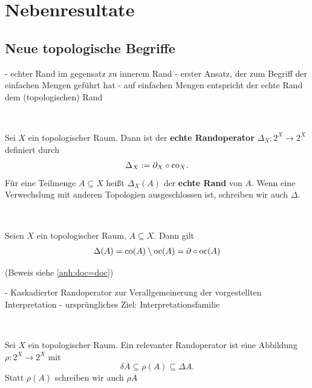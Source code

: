 \chapter{Nebenresultate}\label{chap:nebenresultat}

\section{Neue topologische Begriffe}

    - echter Rand im gegensatz zu innerem Rand
    - erster Ansatz, der zum Begriff der einfachen Mengen geführt hat
    - auf einfachen Mengen entspricht der echte Rand dem (topologischen) Rand

    \begin{dfn}\label{def:echtR} \ \vspace{8pt}

        \noindent
        Sei $X$ ein topologischer Raum. Dann ist der \textbf{echte Randoperator} $\Delta_X : 2^X \to 2^X$ definiert durch
        \begin{align}
            \Delta_X := \partial_X \circ \text{co}_X.
        \end{align}
        Für eine Teilmenge $A \subseteq X$ heißt $\Delta_X(A)$ der \textbf{echte Rand} von $A$. Wenn eine Verwechslung mit anderen Topologien ausgeschlossen ist, schreiben wir auch $\Delta$.
        
    \end{dfn}


    \begin{satz} \label{satz:dco=doc} \ \vspace{8pt}

        \noindent
        Seien $X$ ein topologischer Raum, $A \subseteq X$. Dann gilt
        \begin{align*}
            \Delta(A) = \text{co}(A) \setminus \text{oc}(A) = \partial \circ \text{oc}(A)
        \end{align*}	
    \end{satz}
    (Beweis siehe \ref{anh:doc=doc})
    
    - Kaskadierter Randoperator zur Verallgemeinerung der vorgestellten Interpretation
    - ursprüngliches Ziel: Interpretationsfamilie
    
        \begin{dfn}\label{dfn:relevanter-rand} \ \vspace{8pt}

        \noindent
        Sei $X$ ein topologischer Raum.
        Ein relevanter Randoperator ist eine Abbildung $\rho: 2^X \to 2^X$ mit
        $$ \delta A \subseteq \rho(A) \subseteq \Delta A. $$
        Statt $\rho(A)$ schreiben wir auch $\rho A$
    \end{dfn}
    
